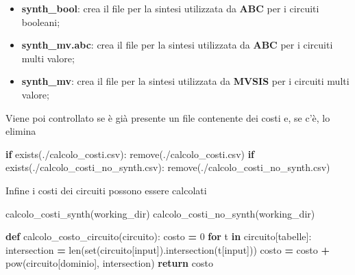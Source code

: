 \documentclass[
]{book}
\newenvironment{Shaded}{\begin{snugshade}}{\end{snugshade}}
\newcommand{\BuiltInTok}[1]{#1}
\newcommand{\ControlFlowTok}[1]{\textcolor[rgb]{0.13,0.29,0.53}{\textbf{#1}}}
\newcommand{\DecValTok}[1]{\textcolor[rgb]{0.00,0.00,0.81}{#1}}
\newcommand{\KeywordTok}[1]{\textcolor[rgb]{0.13,0.29,0.53}{\textbf{#1}}}
\newcommand{\NormalTok}[1]{#1}
\newcommand{\OperatorTok}[1]{\textcolor[rgb]{0.81,0.36,0.00}{\textbf{#1}}}
\newcommand{\StringTok}[1]{\textcolor[rgb]{0.31,0.60,0.02}{#1}}
\providecommand{\tightlist}{%
  \setlength{\itemsep}{0pt}\setlength{\parskip}{0pt}}
\begin{document}
\begin{itemize}
\tightlist
\item
  \textbf{synth\_bool}: crea il file per la sintesi utilizzata da \textbf{ABC} per i circuiti booleani;
\item
  \textbf{synth\_mv.abc}: crea il file per la sintesi utilizzata da \textbf{ABC} per i circuiti multi valore;
\item
  \textbf{synth\_mv}: crea il file per la sintesi utilizzata da \textbf{MVSIS} per i circuiti multi valore;
\end{itemize}

\newpage

Viene poi controllato se è già presente un file contenente dei costi e, se c'è, lo elimina

\begin{Shaded}
\begin{Highlighting}[]
\ControlFlowTok{if}\NormalTok{ exists(}\StringTok{\textquotesingle{}./calcolo\_costi.csv\textquotesingle{}}\NormalTok{):}
\NormalTok{    remove(}\StringTok{\textquotesingle{}./calcolo\_costi.csv\textquotesingle{}}\NormalTok{)}
\ControlFlowTok{if}\NormalTok{ exists(}\StringTok{\textquotesingle{}./calcolo\_costi\_no\_synth.csv\textquotesingle{}}\NormalTok{):}
\NormalTok{    remove(}\StringTok{\textquotesingle{}./calcolo\_costi\_no\_synth.csv\textquotesingle{}}\NormalTok{)}
\end{Highlighting}
\end{Shaded}

Infine i costi dei circuiti possono essere calcolati

\begin{Shaded}
\begin{Highlighting}[]
\NormalTok{calcolo\_costi\_synth(working\_dir)}
\NormalTok{calcolo\_costi\_no\_synth(working\_dir)}

\KeywordTok{def}\NormalTok{ calcolo\_costo\_circuito(circuito):}
\NormalTok{  costo }\OperatorTok{=} \DecValTok{0}
  \ControlFlowTok{for}\NormalTok{ t }\KeywordTok{in}\NormalTok{ circuito[}\StringTok{\textquotesingle{}tabelle\textquotesingle{}}\NormalTok{]:}
\NormalTok{    intersection }\OperatorTok{=} \BuiltInTok{len}\NormalTok{(}\BuiltInTok{set}\NormalTok{(circuito[}\StringTok{\textquotesingle{}input\textquotesingle{}}\NormalTok{]).intersection(t[}\StringTok{\textquotesingle{}input\textquotesingle{}}\NormalTok{]))}
\NormalTok{    costo }\OperatorTok{=}\NormalTok{ costo }\OperatorTok{+} \BuiltInTok{pow}\NormalTok{(circuito[}\StringTok{\textquotesingle{}dominio\textquotesingle{}}\NormalTok{], intersection)}
  \ControlFlowTok{return}\NormalTok{ costo}
\end{Highlighting}
\end{Shaded}
\end{document}
